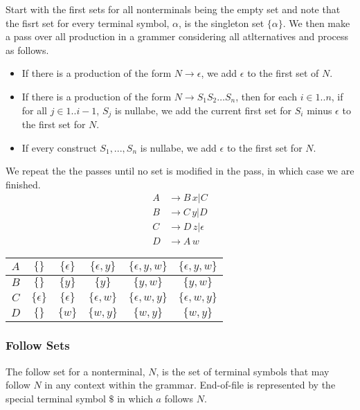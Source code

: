 Start with the first sets for all nonterminals being the empty set and note that the fisrt set for every terminal symbol, $\alpha$, is the singleton set $\{\alpha\}$.
We then make a pass over all production in a grammer considering all atlternatives and process as follows.
\begin{itemize}
    \item If there is a production of the form $N \rightarrow \epsilon$, we add $\epsilon$ to the first set of $N$.
    \item If there is a production of the form $N \rightarrow S_1 S_2 \dots S_n$, then for each $i \in 1..n$, if for all $j \in 1..i-1$, $S_j$ is nullabe, we add the current first set for $S_i$ minus $\epsilon$ to the first set for $N$.
    \item If every construct $S_1,...,S_n$ is nullabe, we add $\epsilon$ to the first set for $N$. 
\end{itemize}
We repeat the the passes until no set is modified in the pass, in which case we are finished.
\begin{align*}
    A &\rightarrow B\,x | C\\
    B &\rightarrow C\,y | D\\
    C &\rightarrow D\,z | \epsilon\\
    D &\rightarrow A\,w
\end{align*}
\begin{center}
\begin{tabular}{|c|c|c|c|c|c|}
    \hline
    $A$ & $\{\}$ & $\{\epsilon\}$ & $\{\epsilon,y\}$ &  $\{\epsilon,y,w\}$ &  $\{\epsilon,y,w\}$\\
    \hline
    $B$ & $\{\}$ & $\{y\}$ & $\{y\}$ &  $\{y,w\}$ &  $\{y,w\}$\\
    \hline
    $C$ & $\{\epsilon\}$ & $\{\epsilon\}$ & $\{\epsilon,w\}$ &  $\{\epsilon,w,y\}$ &  $\{\epsilon,w,y\}$\\
    \hline
    $D$ & $\{\}$ & $\{w\}$ & $\{w,y\}$ &  $\{w,y\}$ &  $\{w,y\}$\\
    \hline
\end{tabular}
\end{center}



\subsubsection{Follow Sets}
The follow set for a nonterminal, $N$, is the set of terminal symbols that may follow $N$ in any context within the grammar.
End-of-file is represented by the special terminal symbol $\$$ in which $a$ follows $N$.

